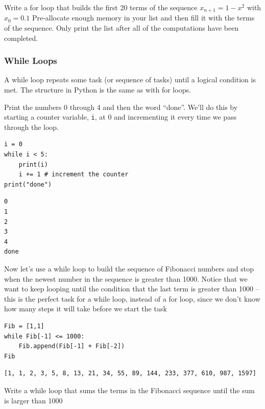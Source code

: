 \begin{problem}
    Write a for loop that builds the first 20 terms of the sequence  $x_{n+1}=1-x^2$ with
    $x_0=0.1$ Pre-allocate enough memory in your list and then fill it with the terms of
    the sequence. Only print the list after all of the computations have been completed.
\end{problem}

\subsubsection{While Loops}
A while loop repeats some task (or sequence of tasks) until a logical condition is met.
The structure in Python is the same as with for loops.

\begin{example}
    Print the numbers 0 through 4 and then the word ``done''. We'll do this by starting a
    counter variable, \texttt{i}, at 0 and incrementing it every time we pass through the
    loop.

    \bcode
\begin{lstlisting}
i = 0
while i < 5:
    print(i)
    i += 1 # increment the counter
print("done")
\end{lstlisting}
\boutput
\begin{lstlisting}
0
1
2
3
4
done
\end{lstlisting}
\end{example}

\begin{example}
    Now let's use a while loop to build the sequence of Fibonacci numbers and stop when
    the newest number in the sequence is greater than 1000. Notice that we want to keep
    looping until the condition that the last term is greater than 1000 -- this is the
    perfect task for a while loop, instead of a for loop, since we don't know how many steps
    it will take before we start the task

    \bcode
\begin{lstlisting}
Fib = [1,1]
while Fib[-1] <= 1000:
    Fib.append(Fib[-1] + Fib[-2])
Fib
\end{lstlisting}
\boutput
\begin{lstlisting}
[1, 1, 2, 3, 5, 8, 13, 21, 34, 55, 89, 144, 233, 377, 610, 987, 1597]
\end{lstlisting}

\end{example}

\begin{problem}
    Write a while loop that sums the terms in the Fibonacci sequence until the sum is
    larger than 1000
\end{problem}


